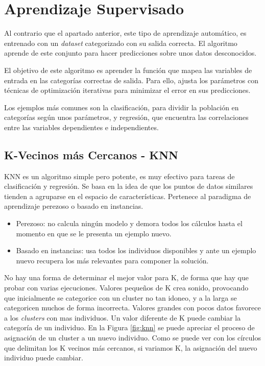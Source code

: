 \section{Aprendizaje Supervisado}
	Al contrario que el apartado anterior, este tipo de aprendizaje automático, es entrenado con un \textit{dataset} categorizado con su salida correcta. El algoritmo aprende de este conjunto para hacer predicciones sobre unos datos desconocidos.
	
	El objetivo de este algoritmo es aprender la función que mapea las variables de entrada en las categorías correctas de salida. Para ello, ajusta los parámetros con técnicas de optimización iterativas para minimizar el error en sus predicciones.
	
	Los ejemplos más comunes son la clasificación, para dividir la población en categorías según unos parámetros, y regresión, que encuentra las correlaciones entre las variables dependientes e independientes.


	\subsection{K-Vecinos más Cercanos - KNN}

		KNN es un algoritmo simple pero potente, es muy efectivo para tareas de clasificación y regresión. Se basa en la idea de que los puntos de datos similares tienden a agruparse en el espacio de características. Pertenece al paradigma de aprendizaje perezoso o basado en instancias.
		
		\begin{itemize}
			\item Perezoso: no calcula ningún modelo y demora todos los cálculos hasta el momento en que se le presenta un ejemplo nuevo.			
			\item Basado en instancias: usa todos los individuos disponibles y ante un ejemplo nuevo recupera los más relevantes para componer la solución.	
		\end{itemize}
		
		No hay una forma de determinar el mejor valor para K, de forma que hay que probar con varias ejecuciones. Valores pequeños de K crea sonido, provocando que inicialmente se categorice con un cluster no tan idoneo, y a la larga se categoricen muchos de forma incorrecta. Valores grandes con pocos datos favorece a los \textit{clusters} con mas individuos. Un valor diferente de K puede cambiar la categoría de un individuo. En la Figura \ref{fig:knn} se puede apreciar el proceso de asignación de un cluster a un nuevo individuo. Como se puede ver con los círculos que delimitan los K vecinos más cercanos, si variamos K, la asignación del nuevo individuo puede cambiar.

